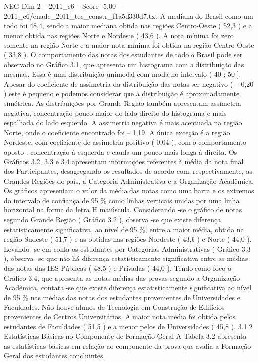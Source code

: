\begin{textsample}{NEG Dim 2 – 2011\_c6 – Score -5.00 – 2011\_c6/enade\_2011\_tec\_constr\_f1a5d330d7.txt}
A mediana do Brasil como um todo foi 48,4, sendo a maior mediana obtida nas regiões Centro-Oeste ( 52,3 ) e a menor obtida nas regiões Norte e Nordeste ( 43,6 ).
A nota mínima foi zero somente na região Norte e a maior nota mínima foi obtida na região Centro-Oeste ( 33,8 ).
O comportamento das notas dos estudantes de todo o Brasil pode ser observado no Gráfico 3.1, que apresenta um histograma com a distribuição das mesmas.
Essa é uma distribuição unimodal com moda no intervalo ( 40 ; 50 ].
Apesar do coeficiente de assimetria da distribuição das notas ser negativo ( – 0,20 ) este é pequeno e podemos considerar que a distribuição é aproximadamente simétrica.
As distribuições por Grande Região também apresentam assimetria negativa, concentração pouco maior do lado direito do histograma e mais espalhada do lado esquerdo.
A assimetria negativa é mais acentuada na região Norte, onde o coeficiente encontrado foi – 1,19.
A única exceção é a região Nordeste, com coeficiente de assimetria positivo ( 0,04 ), com o comportamento oposto : concentração à esquerda e cauda um pouco mais longa à direita.
Os Gráficos 3.2, 3.3 e 3.4 apresentam informações referentes à média da nota final dos Participantes, desagregando os resultados de acordo com, respectivamente, as Grandes Regiões do país, a Categoria Administrativa e a Organização Acadêmica.
Os gráficos apresentam o valor da média das notas como uma barra e os extremos do intervalo de confiança de 95 \% como linhas verticais unidas por uma linha horizontal na forma da letra H maiúscula.
Considerando -se o gráfico de notas segundo Grande Região ( Gráfico 3.2 ), observa -se que existe diferença estatisticamente significativa, ao nível de 95 \%, entre a maior média, obtida na região Sudeste ( 51,7 ) e as obtidas nas regiões Nordeste ( 43,6 ) e Norte ( 44,0 ).
Levando -se em conta os estudantes por Categorias Administrativas ( Gráfico 3.3 ), observa -se que não há diferença estatisticamente significativa entre as médias das notas das IES Públicas ( 48,5 ) e Privadas ( 44,0 ).
Tendo como foco o Gráfico 3.4, que apresenta as notas médias das provas segundo a Organização Acadêmica, contata -se que existe diferença estatisticamente significativa ao nível de 95 \% nas médias das notas dos estudantes provenientes de Universidades e Faculdades.
Não houve alunos de Tecnologia em Construção de Edifícios provenientes de Centros Universitários.
A maior nota média foi obtida pelos estudantes de Faculdades ( 51,5 ) e a menor pelos de Universidades ( 45,8 ). 3.1.2 Estatísticas Básicas no Componente de Formação Geral A Tabela 3.2 apresenta as estatísticas básicas em relação ao componente da prova que avalia a Formação Geral dos estudantes concluintes.

\end{textsample}
